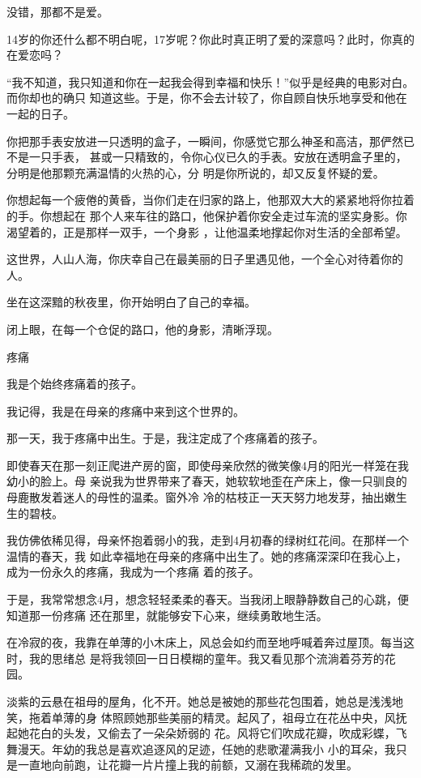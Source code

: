 \documentclass[12pt,a4paper]{article}
\newcommand{\subpart}[1]{
	\begingroup \par
	\vspace{1ex} \centering #1
	\par \endgroup
}
\begin{document}
		没错，那都不是爱。

		14岁的你还什么都不明白呢，17岁呢？你此时真正明了爱的深意吗？此时，你真的在爱恋吗？

		“我不知道，我只知道和你在一起我会得到幸福和快乐！”似乎是经典的电影对白。而你却也的确只
	知道这些。于是，你不会去计较了，你自顾自快乐地享受和他在一起的日子。

		你把那手表安放进一只透明的盒子，一瞬间，你感觉它那么神圣和高洁，那俨然已不是一只手表，
	甚或一只精致的，令你心仪已久的手表。安放在透明盒子里的，分明是他那颗充满温情的火热的心，分
	明是你所说的，却又反复怀疑的爱。

		你想起每一个疲倦的黄昏，当你们走在归家的路上，他那双大大的紧紧地将你拉着的手。你想起在
	那个人来车往的路口，他保护着你安全走过车流的坚实身影。你渴望着的，正是那样一双手，一个身影
	，让他温柔地撑起你对生活的全部希望。

		这世界，人山人海，你庆幸自己在最美丽的日子里遇见他，一个全心对待着你的人。

		坐在这深黯的秋夜里，你开始明白了自己的幸福。

		闭上眼，在每一个仓促的路口，他的身影，清晰浮现。

	\endwriting



		\subpart{疼痛}
		我是个始终疼痛着的孩子。

		我记得，我是在母亲的疼痛中来到这个世界的。

		那一天，我于疼痛中出生。于是，我注定成了个疼痛着的孩子。

		即使春天在那一刻正爬进产房的窗，即使母亲欣然的微笑像4月的阳光一样笼在我幼小的脸上。母
	亲说我为世界带来了春天，她软软地歪在产床上，像一只驯良的母鹿散发着迷人的母性的温柔。窗外冷
	冷的枯枝正一天天努力地发芽，抽出嫩生生的碧枝。

		我仿佛依稀见得，母亲怀抱着弱小的我，走到4月初春的绿树红花间。在那样一个温情的春天，我
	如此幸福地在母亲的疼痛中出生了。她的疼痛深深印在我心上，成为一份永久的疼痛，我成为一个疼痛
	着的孩子。

		于是，我常常想念4月，想念轻轻柔柔的春天。当我闭上眼静静数自己的心跳，便知道那一份疼痛
	还在那里，就能够安下心来，继续勇敢地生活。

		在冷寂的夜，我靠在单薄的小木床上，风总会如约而至地呼喊着奔过屋顶。每当这时，我的思绪总
	是将我领回一日日模糊的童年。我又看见那个流淌着芬芳的花园。

		淡紫的云悬在祖母的屋角，化不开。她总是被她的那些花包围着，她总是浅浅地笑，拖着单薄的身
	体照顾她那些美丽的精灵。起风了，祖母立在花丛中央，风抚起她花白的头发，又偷去了一朵朵娇弱的
	花。风将它们吹成花瓣，吹成彩蝶，飞舞漫天。年幼的我总是喜欢追逐风的足迹，任她的悲歌灌满我小
	小的耳朵，我只是一直地向前跑，让花瓣一片片撞上我的前额，又溺在我稀疏的发里。
\end{document}
